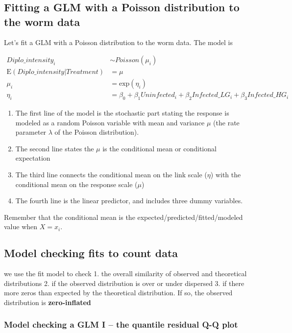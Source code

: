 \documentclass[]{book}
\providecommand{\tightlist}{%
  \setlength{\itemsep}{0pt}\setlength{\parskip}{0pt}}
\begin{document}
\subsection{Fitting a GLM with a Poisson distribution to the worm
data}\label{fitting-a-glm-with-a-poisson-distribution-to-the-worm-data}

Let's fit a GLM with a Poisson distribution to the worm data. The model
is

\begin{align}
Diplo\_intensity_i &\sim Poisson(\mu_i)\\
\mathrm{E}({Diplo\_intensity|Treatment}) &= \mu\\
\mu_i &= \mathrm{exp}(\eta_i)\\
\eta_i &= \beta_0 + \beta_1 Uninfected_i + \beta_2 Infected\_LG_i + \beta_3 Infected\_HG_i
\end{align}

\begin{enumerate}
\def\labelenumi{\arabic{enumi}.}
\tightlist
\item
  The first line of the model is the stochastic part stating the
  response is modeled as a random Poisson variable with mean and
  variance \(\mu\) (the rate parameter \(\lambda\) of the Poisson
  distribution).
\item
  The second line states the \(\mu\) is the conditional mean or
  conditional expectation
\item
  The third line connects the conditional mean on the link scale
  (\(\eta\)) with the conditional mean on the response scale (\(\mu\))
\item
  The fourth line is the linear predictor, and includes three dummy
  variables.
\end{enumerate}

Remember that the conditional mean is the
expected/predicted/fitted/modeled value when \(X=x_i\).

\subsection{Model checking fits to count
data}\label{model-checking-fits-to-count-data}

we use the fit model to check 1. the overall similarity of observed and
theoretical distributions 2. if the observed distribution is over or
under dispersed 3. if there more zeros than expected by the theoretical
distribution. If so, the observed distribution is \textbf{zero-inflated}

\subsubsection{Model checking a GLM I -- the quantile residual Q-Q
plot}\label{model-checking-a-glm-i-the-quantile-residual-q-q-plot}
\end{document}
